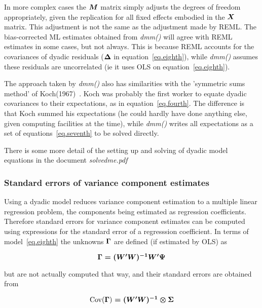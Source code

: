 \documentclass[titlepage]{article}  %
\begin{document}
In more complex cases the $\mbox{\boldmath $M$}$ matrix simply adjusts the degrees of freedom appropriately, given the replication for all fixed effects embodied in the $\mbox{\boldmath $X$}$ matrix. This adjustment is not the same as the adjustment made by REML. The bias-corrected ML estimates obtained from {\em dmm()} will agree with REML estimates in some cases, but not always. This is because REML accounts for the covariances of dyadic residuals ($\mbox{\boldmath $\Delta$}$ in equation~\ref{eq.eighth}), while {\em dmm()} assumes these residuals are uncorrelated (ie it uses OLS on equation~\ref{eq.eighth}).

 The approach taken by {\em dmm()} also has similarities with the 'symmetric sums method' of Koch(1967)~\cite{koch:67}. Koch was probably the first worker to equate dyadic covariances to their expectations, as in equation~\ref{eq.fourth}. The difference is that Koch summed his expectations (he could hardly have done anything else, given computing facilities at the time), while {\em dmm()} writes all expectations as a set of equations~\ref{eq.seventh} to be solved directly.
 
 There is some more detail of the setting up and solving of dyadic model equations in the document {\em solvedme.pdf}~\cite{jack:15}

\subsubsection{Standard errors of variance component estimates}
Using a dyadic model reduces variance component estimation to a multiple linear regression problem, the components being estimated as regression coefficients. Therefore standard errors for variance component estimates can be computed using expressions for the standard error of a regresssion coefficient. In terms of model~\ref{eq.eighth} the unknowns $\mbox{\boldmath $\Gamma$}$ are defined (if estimated by OLS) as

\begin{displaymath}
\mbox{\boldmath $\Gamma = (W^{\prime}W)^{-1}W^{\prime}\Psi$}
\end{displaymath}

but are not actually computed that way,
and their standard errors are obtained  from

\begin{displaymath}
\mbox{Cov(\boldmath $\Gamma$) $ = (W^{\prime}W)^{-1} \otimes \Sigma$}
\end{displaymath}
\end{document}
